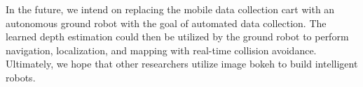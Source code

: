 \documentclass[letterpaper, 10 pt, conference]{ieeeconf}  %
\begin{document}
In the future, we intend on replacing the mobile data collection cart with an autonomous ground robot with the goal of automated data collection. The learned depth estimation could then be utilized by the ground robot to perform navigation, localization, and mapping with real-time collision avoidance. Ultimately, we hope that other researchers utilize image bokeh to build intelligent robots. 



%


\pagebreak

\end{document}
